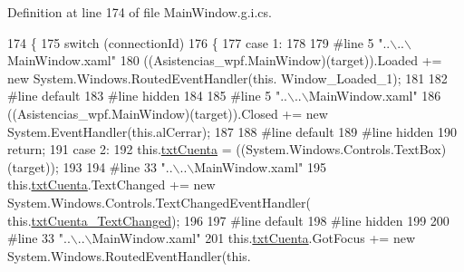 Definition at line 174 of file Main\-Window.\-g.\-i.\-cs.


\begin{DoxyCode}
174                                                                                                 \{
175             \textcolor{keywordflow}{switch} (connectionId)
176             \{
177             \textcolor{keywordflow}{case} 1:
178             
179 \textcolor{preprocessor}{            #line 5 "..\(\backslash\)..\(\backslash\)MainWindow.xaml"}
180 \textcolor{preprocessor}{}            ((Asistencias\_wpf.MainWindow)(target)).Loaded += \textcolor{keyword}{new} System.Windows.RoutedEventHandler(\textcolor{keyword}{this}.
      Window\_Loaded\_1);
181             
182 \textcolor{preprocessor}{            #line default}
183 \textcolor{preprocessor}{}\textcolor{preprocessor}{            #line hidden}
184 \textcolor{preprocessor}{}            
185 \textcolor{preprocessor}{            #line 5 "..\(\backslash\)..\(\backslash\)MainWindow.xaml"}
186 \textcolor{preprocessor}{}            ((Asistencias\_wpf.MainWindow)(target)).Closed += \textcolor{keyword}{new} System.EventHandler(\textcolor{keyword}{this}.alCerrar);
187             
188 \textcolor{preprocessor}{            #line default}
189 \textcolor{preprocessor}{}\textcolor{preprocessor}{            #line hidden}
190 \textcolor{preprocessor}{}            \textcolor{keywordflow}{return};
191             \textcolor{keywordflow}{case} 2:
192             this.\hyperlink{class_asistencias__wpf_1_1_main_window_a52e76fc15be974c00138b13ab7e19b44}{txtCuenta} = ((System.Windows.Controls.TextBox)(target));
193             
194 \textcolor{preprocessor}{            #line 33 "..\(\backslash\)..\(\backslash\)MainWindow.xaml"}
195 \textcolor{preprocessor}{}            this.\hyperlink{class_asistencias__wpf_1_1_main_window_a52e76fc15be974c00138b13ab7e19b44}{txtCuenta}.TextChanged += \textcolor{keyword}{new} System.Windows.Controls.TextChangedEventHandler(
      this.\hyperlink{class_asistencias__wpf_1_1_main_window_af16b10485e73a8cc0c7cef9d26983798}{txtCuenta\_TextChanged});
196             
197 \textcolor{preprocessor}{            #line default}
198 \textcolor{preprocessor}{}\textcolor{preprocessor}{            #line hidden}
199 \textcolor{preprocessor}{}            
200 \textcolor{preprocessor}{            #line 33 "..\(\backslash\)..\(\backslash\)MainWindow.xaml"}
201 \textcolor{preprocessor}{}            this.\hyperlink{class_asistencias__wpf_1_1_main_window_a52e76fc15be974c00138b13ab7e19b44}{txtCuenta}.GotFocus += \textcolor{keyword}{new} System.Windows.RoutedEventHandler(this.

\end{DoxyCode}
